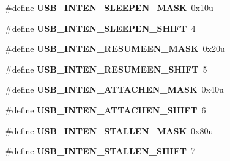 \begin{DoxyCompactItemize}
\item 
\#define {\bfseries U\+S\+B\+\_\+\+I\+N\+T\+E\+N\+\_\+\+S\+L\+E\+E\+P\+E\+N\+\_\+\+M\+A\+SK}~0x10u\hypertarget{group__USB__Register__Masks_gac2cf7613141a7333e152b43e42e6ee53}{}\label{group__USB__Register__Masks_gac2cf7613141a7333e152b43e42e6ee53}

\item 
\#define {\bfseries U\+S\+B\+\_\+\+I\+N\+T\+E\+N\+\_\+\+S\+L\+E\+E\+P\+E\+N\+\_\+\+S\+H\+I\+FT}~4\hypertarget{group__USB__Register__Masks_ga8e3c25dd5e743c21fc277d45640d5a5e}{}\label{group__USB__Register__Masks_ga8e3c25dd5e743c21fc277d45640d5a5e}

\item 
\#define {\bfseries U\+S\+B\+\_\+\+I\+N\+T\+E\+N\+\_\+\+R\+E\+S\+U\+M\+E\+E\+N\+\_\+\+M\+A\+SK}~0x20u\hypertarget{group__USB__Register__Masks_ga9bcc213c102e47e0700cd463b9198470}{}\label{group__USB__Register__Masks_ga9bcc213c102e47e0700cd463b9198470}

\item 
\#define {\bfseries U\+S\+B\+\_\+\+I\+N\+T\+E\+N\+\_\+\+R\+E\+S\+U\+M\+E\+E\+N\+\_\+\+S\+H\+I\+FT}~5\hypertarget{group__USB__Register__Masks_ga49c43d3fce5392a3d68780ebd02cb5df}{}\label{group__USB__Register__Masks_ga49c43d3fce5392a3d68780ebd02cb5df}

\item 
\#define {\bfseries U\+S\+B\+\_\+\+I\+N\+T\+E\+N\+\_\+\+A\+T\+T\+A\+C\+H\+E\+N\+\_\+\+M\+A\+SK}~0x40u\hypertarget{group__USB__Register__Masks_gada08eb0b0c86565a19f43a0c9fbf293b}{}\label{group__USB__Register__Masks_gada08eb0b0c86565a19f43a0c9fbf293b}

\item 
\#define {\bfseries U\+S\+B\+\_\+\+I\+N\+T\+E\+N\+\_\+\+A\+T\+T\+A\+C\+H\+E\+N\+\_\+\+S\+H\+I\+FT}~6\hypertarget{group__USB__Register__Masks_ga2dcfada22ae8ed86992f14be6ab3f070}{}\label{group__USB__Register__Masks_ga2dcfada22ae8ed86992f14be6ab3f070}

\item 
\#define {\bfseries U\+S\+B\+\_\+\+I\+N\+T\+E\+N\+\_\+\+S\+T\+A\+L\+L\+E\+N\+\_\+\+M\+A\+SK}~0x80u\hypertarget{group__USB__Register__Masks_ga18443f2f26840b47e4b4088d25f51c68}{}\label{group__USB__Register__Masks_ga18443f2f26840b47e4b4088d25f51c68}

\item 
\#define {\bfseries U\+S\+B\+\_\+\+I\+N\+T\+E\+N\+\_\+\+S\+T\+A\+L\+L\+E\+N\+\_\+\+S\+H\+I\+FT}~7\hypertarget{group__USB__Register__Masks_gac8b0e5912467cf86c8a2fcc3c1e98e24}{}\label{group__USB__Register__Masks_gac8b0e5912467cf86c8a2fcc3c1e98e24}


\end{DoxyCompactItemize}
